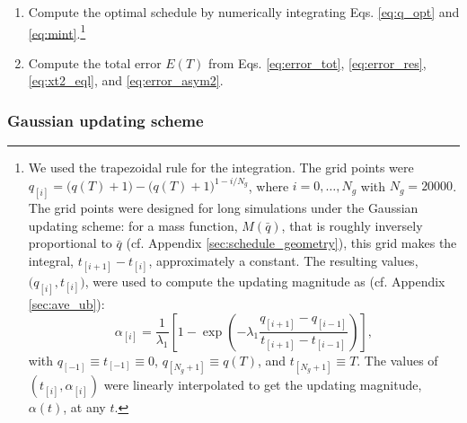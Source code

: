 \documentclass[reprint, superscriptaddress, floatfix]{revtex4-1}
\newcommand{\Err}{E}
\begin{document}
\begin{enumerate}
\item \label{step:alpha}
Compute the optimal schedule by
numerically integrating
Eqs. \eqref{eq:q_opt} and \eqref{eq:mint}.\footnote{We
  used the trapezoidal rule for the integration.
  The grid points were
  $q_{[i]} = \bigl(q(T) + 1\bigr) - \bigl(q(T)+1\bigr)^{1-i/N_g}$,
  where $i = 0, \dots, N_g$
  with $N_g = 20000$.
  The grid points were designed for long simulations
  under the Gaussian updating scheme:
  for a mass function, $M(\bar q)$, that is roughly
  inversely proportional to $\bar q$
  (cf. Appendix \ref{sec:schedule_geometry}),
  this grid makes the integral,
  $t_{[i+1]} - t_{[i]}$,
  approximately a constant.
  The resulting values, $\bigl(q_{[i]}, t_{[i]} \bigr)$,
  were used to compute the updating magnitude
  as (cf. Appendix \ref{sec:ave_ub}):
  $$%
    \alpha_{[i]}
    =
    \frac{1}{\lambda_1}
    \left[
      1
      -
      \exp\left(
      -\lambda_1
      \frac{ q_{[i+1]} - q_{[i-1]} }
           { t_{[i+1]} - t_{[i-1]} }
      \right)
    \right]
    ,
  $$%
  with
  $q_{[ -1]} \equiv t_{[-1]} \equiv 0$,
  $q_{[N_g+1]} \equiv q(T)$,
  and
  $t_{[N_g+1]} \equiv T$.
  The values of $(t_{[i]}, \alpha_{[i]})$
  were linearly interpolated
  to get the updating magnitude, $\alpha(t)$, at any $t$.
  }
%


\item
Compute the total error $\Err(T)$ from
Eqs.
\eqref{eq:error_tot},
\eqref{eq:error_res},
\eqref{eq:xt2_eql},
and
\eqref{eq:error_asym2}.

\end{enumerate}

%



\subsubsection{\label{sec:Gaussian_scheme}
Gaussian updating scheme}
\end{document}
